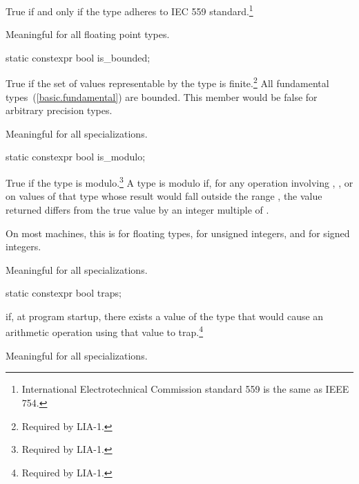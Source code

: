 \begin{itemdescr}
\pnum
True if and only if the type adheres to IEC 559 standard.\footnote{International
Electrotechnical Commission standard 559 is the same as
IEEE 754.}

\pnum
Meaningful for all floating point types.
\end{itemdescr}

\begin{itemdecl}
static constexpr bool is_bounded;
\end{itemdecl}

\begin{itemdescr}
\pnum
True if the set of values representable by the type is finite.\footnote{Required by LIA-1.}
\enternote All fundamental types~(\ref{basic.fundamental}) are bounded. This member would be false for arbitrary
precision types.\exitnote

\pnum
Meaningful for all specializations.
\end{itemdescr}

\begin{itemdecl}
static constexpr bool is_modulo;
\end{itemdecl}

\begin{itemdescr}
\pnum
True if the type is modulo.\footnote{Required by LIA-1.}
A type is modulo if, for any operation involving \tcode{+}, \tcode{-}, or
\tcode{*} on values of that type whose result would fall outside the range
, the value returned differs from the true value by an
integer multiple of .

\pnum
On most machines, this is
for floating types,
for unsigned integers, and
for signed integers.

\pnum
Meaningful for all specializations.
\end{itemdescr}

\begin{itemdecl}
static constexpr bool traps;
\end{itemdecl}

\begin{itemdescr}
\pnum
{}
if, at program startup, there exists a value of the type that would cause
an arithmetic operation using that value to trap.\footnote{Required by LIA-1.}

\pnum
Meaningful for all specializations.
\end{itemdescr}

